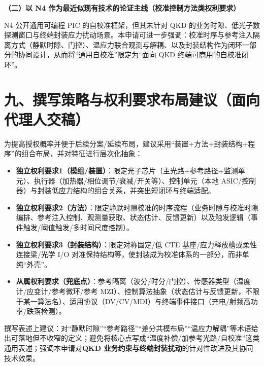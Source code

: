 \documentclass[12pt,a4paper]{article}
\begin{document}
\textbf{（二）以 N4 作为最近似现有技术的论证主线（校准控制方法类权利要求）}

N4 公开通用可编程 PIC 的自校准框架，但其未针对 QKD 的业务时隙、低光子数探测窗口与终端封装应力扰动场景。本申请可进一步强调：校准时序与参考注入隔离方式（静默时隙、门控）、温应力联合观测与解耦、以及封装结构作为闭环一部分的协同设计，从而将“通用自校准”限定为“面向 QKD 终端可商用的自校准闭环”。

\section*{九、撰写策略与权利要求布局建议（面向代理人交稿）}

为提高授权概率并便于后续分案/延续布局，建议采用“装置+方法+封装结构+程序”的组合布局，并对特征进行层次化抽象：
\begin{itemize}[leftmargin=2em]
    \item \textbf{独立权利要求1（模组/装置）}：限定光子芯片（主光路+参考路径+监测单元）、执行器（加热器/相位调节/衰减/开关等）、控制单元（本地 ASIC/控制器）与封装低应力结构的组合关系，并突出短闭环与终端适配。
    \item \textbf{独立权利要求2（方法）}：限定静默时隙校准的时序流程（业务时隙与校准时隙编排、参考注入控制、观测量获取、状态估计、反馈更新）以及触发逻辑（事件触发/阈值触发/多时间尺度控制）。
    \item \textbf{独立权利要求3（封装结构）}：限定对称固定/低 CTE 基座/应力释放槽或柔性连接梁/光学 I/O 对准保持结构等，使封装成为校准体系的一部分，而非单纯“外壳”。
    \item \textbf{从属权利要求（兜底点）}：参考隔离（波分/时分/门控）、传感器类型（温度计/应变计/参考微环/参考 MZI）、控制算法抽象（状态估计与反馈更新，不限于某一算法名）、适用协议（DV/CV/MDI）与终端事件接口（充电/射频高功率/跌落检测）。
\end{itemize}

撰写表述上建议：对“静默时隙”“参考路径”“差分共模布局”“温应力解耦”等术语给出可落地但不收窄的定义；避免将核心点写成“温度补偿/加参考光路/自校准”这类通用表述；强调本申请对\textbf{QKD 业务约束与终端封装扰动}的针对性改进及其协同技术效果。
\end{document}
